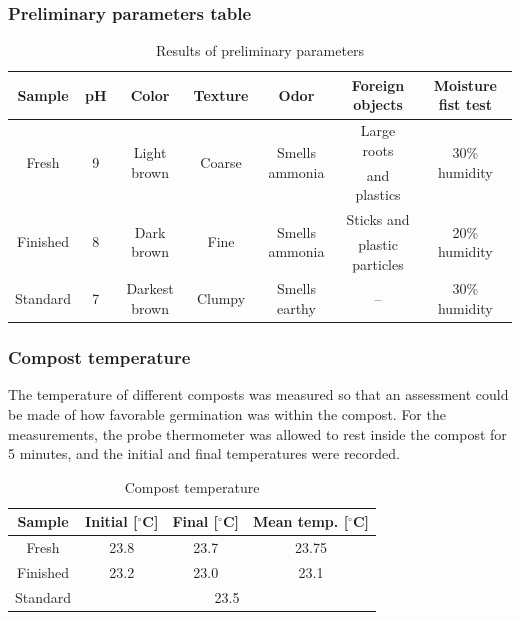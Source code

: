 \documentclass{article}
\begin{document}
\subsubsection{Preliminary parameters table}
\renewcommand{\arraystretch}{1.5}
\begin{table}[ht!]
    \centering \vspace{.3cm}
    \caption{Results of preliminary parameters}
    \hspace*{-.3cm}
    \begin{tabular}{|c|c|c|c|c|c|c|}
        \hline
        \textbf{Sample} & \textbf{pH} & \textbf{Color} & \textbf{Texture} & \textbf{Odor} & \textbf{Foreign objects} & \textbf{Moisture fist test}\\
        \hline
        \multirow{2}{*}{Fresh} & \multirow{2}{*}{9} & \multirow{2}{*}{Light brown} & \multirow{2}{*}{Coarse} & \multirow{2}{*}{Smells ammonia} & Large roots & \multirow{2}{*}{30\% humidity} \\
        & & & & & and plastics & \\
        \hline                                                                  
        \multirow{2}{*}{Finished} & \multirow{2}{*}{8} & \multirow{2}{*}{Dark brown} & \multirow{2}{*}{Fine} & \multirow{2}{*}{Smells ammonia} & Sticks and & \multirow{2}{*}{20\% humidity} \\
        & & & & & plastic particles & \\
        \hline
        Standard & 7 & Darkest brown & Clumpy & Smells earthy & -- & 30\% humidity\\
        \hline
    \end{tabular}
\end{table}
\phantom{} \vspace*{-.2cm}

\subsubsection{Compost temperature}
The temperature of different composts was measured so that an
assessment could be made of how favorable germination was within the
compost. For the measurements, the probe thermometer was allowed to
rest inside the compost for 5 minutes, and the initial and final
temperatures were recorded.

\begin{table}[ht!]
    \centering \vspace{.3cm}
    \caption{Compost temperature}
    \hspace*{-.3cm}
    \begin{tabular}{|c|c|c|c|}
        \hline
        \textbf{Sample} & \textbf{Initial} [$^\circ$C] & \textbf{Final} [$^\circ$C] & \textbf{Mean temp.} [$^\circ$C]\\
        \hline
        Fresh & 23.8 & 23.7 & 23.75 \\
        \hline
        Finished & 23.2 & 23.0 & 23.1\\
        \hline
        Standard & \multicolumn{3}{c|}{23.5}\\
        \hline
    \end{tabular}
\end{table}
\end{document}

